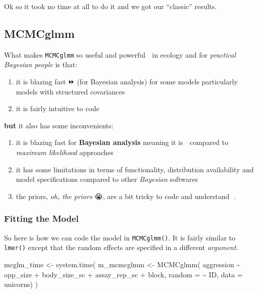 \documentclass[
  12pt,
]{book}
\newenvironment{Shaded}{\begin{snugshade}}{\end{snugshade}}
\newcommand{\AttributeTok}[1]{\textcolor[rgb]{0.77,0.63,0.00}{#1}}
\newcommand{\FunctionTok}[1]{\textcolor[rgb]{0.00,0.00,0.00}{#1}}
\newcommand{\NormalTok}[1]{#1}
\newcommand{\OtherTok}[1]{\textcolor[rgb]{0.56,0.35,0.01}{#1}}
\newcommand{\SpecialCharTok}[1]{\textcolor[rgb]{0.00,0.00,0.00}{#1}}
\providecommand{\tightlist}{%
  \setlength{\itemsep}{0pt}\setlength{\parskip}{0pt}}
\begin{document}
Ok so it took no time at all to do it and we got our ``classic'' results.

\hypertarget{mcmcglmm}{%
\subsection{MCMCglmm}\label{mcmcglmm}}

What makes \texttt{MCMCglmm} so useful and powerful 💪 in ecology and for \emph{practical Bayesian people} is that:

\begin{enumerate}
\def\labelenumi{\arabic{enumi}.}
\tightlist
\item
  it is blazing fast ⏩ (for Bayesian analysis) for some models particularly models with structured covariances
\item
  it is fairly intuitive to code
\end{enumerate}

\textbf{but} it also has some inconvenients:

\begin{enumerate}
\def\labelenumi{\arabic{enumi}.}
\tightlist
\item
  it is blazing fast for \textbf{Bayesian analysis} meaning it is 🐌 compared to \emph{maximum likelihood} approaches
\item
  it has some limitations in terms of functionality, distribution availability and model specifications compared to other \emph{Bayesian} softwares
\item
  the priors, \emph{oh, the priors} 😭, are a bit tricky to code and understand 🤯.
\end{enumerate}

\hypertarget{fitting-the-model}{%
\subsubsection{Fitting the Model}\label{fitting-the-model}}

So here is how we can code the model in \texttt{MCMCglmm()}. It is fairly similar to \texttt{lmer()} except that the random effects are specified in a different \emph{argument}.

\begin{Shaded}
\begin{Highlighting}[]
\NormalTok{mcglm\_time }\OtherTok{\textless{}{-}} \FunctionTok{system.time}\NormalTok{(}
\NormalTok{  m\_mcmcglmm }\OtherTok{\textless{}{-}} \FunctionTok{MCMCglmm}\NormalTok{(}
\NormalTok{    aggression }\SpecialCharTok{\textasciitilde{}}\NormalTok{ opp\_size }\SpecialCharTok{+}\NormalTok{ body\_size\_sc }\SpecialCharTok{+}\NormalTok{ assay\_rep\_sc }\SpecialCharTok{+}\NormalTok{ block,}
                \AttributeTok{random =} \SpecialCharTok{\textasciitilde{}}\NormalTok{ ID,}
    \AttributeTok{data =}\NormalTok{ unicorns)}
\NormalTok{)}
\end{Highlighting}
\end{Shaded}
\end{document}
